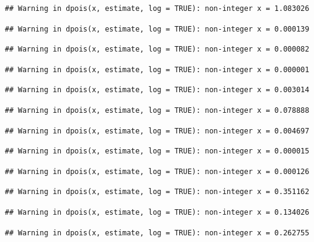 \documentclass[]{article}
\begin{document}
\begin{verbatim}
## Warning in dpois(x, estimate, log = TRUE): non-integer x = 1.083026
\end{verbatim}

\begin{verbatim}
## Warning in dpois(x, estimate, log = TRUE): non-integer x = 0.000139
\end{verbatim}

\begin{verbatim}
## Warning in dpois(x, estimate, log = TRUE): non-integer x = 0.000082
\end{verbatim}

\begin{verbatim}
## Warning in dpois(x, estimate, log = TRUE): non-integer x = 0.000001
\end{verbatim}

\begin{verbatim}
## Warning in dpois(x, estimate, log = TRUE): non-integer x = 0.003014
\end{verbatim}

\begin{verbatim}
## Warning in dpois(x, estimate, log = TRUE): non-integer x = 0.078888
\end{verbatim}

\begin{verbatim}
## Warning in dpois(x, estimate, log = TRUE): non-integer x = 0.004697
\end{verbatim}

\begin{verbatim}
## Warning in dpois(x, estimate, log = TRUE): non-integer x = 0.000015
\end{verbatim}

\begin{verbatim}
## Warning in dpois(x, estimate, log = TRUE): non-integer x = 0.000126
\end{verbatim}

\begin{verbatim}
## Warning in dpois(x, estimate, log = TRUE): non-integer x = 0.351162
\end{verbatim}

\begin{verbatim}
## Warning in dpois(x, estimate, log = TRUE): non-integer x = 0.134026
\end{verbatim}

\begin{verbatim}
## Warning in dpois(x, estimate, log = TRUE): non-integer x = 0.262755
\end{verbatim}
\end{document}

